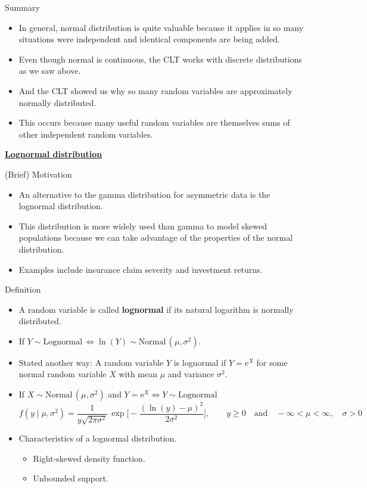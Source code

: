 \documentclass{article}
\newcommand{\bu}[1]{\textbf{\ul{#1}}}				%
\newcommand{\follow}[1]{\sim \text{#1}\,}		%
\newcommand{\e}{\mathrm{e}}		%
\begin{document}
Summary\bigskip
\begin{itemize}
    \item In general, normal distribution is quite valuable because it applies in so many situations were independent and identical components are being added.
    \item[]Even though normal is continuous, the CLT works with discrete distributions as we saw above.
    \item And the CLT showed us why so many random variables are approximately normally distributed.
    \item[] This occurs because many useful random variables are themselves sums of other independent random variables.
\end{itemize}\bigskip

\newpage

\bu{Lognormal distribution}\bigskip

(Brief) Motivation\bigskip
\begin{itemize}
    \item An alternative to the gamma distribution for asymmetric data is the lognormal distribution.
    \item[] This distribution is more widely used than gamma to model skewed populations because we can take advantage of the properties of the normal distribution.
    \item Examples include insurance claim severity and investment returns.
\end{itemize}\bigskip

Definition\bigskip
\begin{itemize}
    \item A random variable is called \textbf{lognormal} if its natural logarithm is normally distributed.
    \item[] If $Y \follow{Lognormal} \Longleftrightarrow \ln(Y) \follow{Normal}(\mu, \sigma^2)$.\bigskip
    \item Stated another way: A random variable $Y$ is lognormal if $Y = \e^X$ for some normal random variable $X$ with mean $\mu$ and variance $\sigma^2$.
    \item[] If $X \follow{Normal}(\mu, \sigma^2)$ and $Y = \e^X \Longleftrightarrow Y \follow{Lognormal}$
    \[f(y \mid \mu, \sigma^2) = \frac{1}{y \sqrt{2 \pi \sigma^2}} \, \exp\bigg[-\frac{(\ln(y) - \mu)^2}{2\sigma^2}\bigg], \quad\quad  y \ge 0 \quad \text{and}\quad -\infty < \mu < \infty, \quad \sigma > 0\]\vspace{30pt}
    \item Characteristics of a lognormal distribution.
    \begin{itemize}
        \item Right-skewed density function.
        \item Unbounded support.
    \end{itemize}
\end{itemize}\bigskip
\end{document}
